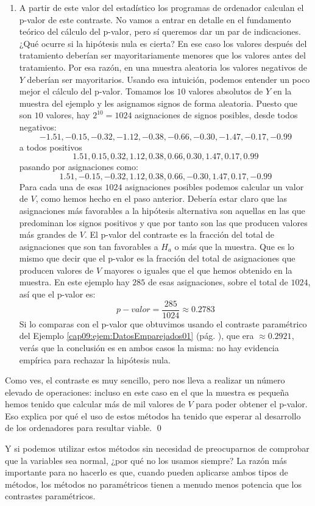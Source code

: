 \begin{ejemplo}
\begin{enumerate}
  \item A partir de este valor del estadístico los programas de ordenador calculan el p-valor de este contraste. No vamos a entrar en detalle en el fundamento teórico del cálculo del p-valor, pero sí queremos dar un par de indicaciones. ¿Qué ocurre si la hipótesis nula es cierta? En ese caso los valores después del tratamiento deberían ser mayoritariamente menores que los valores antes del tratamiento. Por esa razón, en una muestra aleatoria los valores negativos de $Y$ deberían ser mayoritarios. Usando esa intuición, podemos entender un poco mejor el cálculo del p-valor. Tomamos los $10$ valores absolutos de $Y$ en la muestra del ejemplo y les asignamos signos de forma aleatoria. Puesto que son $10$ valores, hay $2^{10} = 1024$ asignaciones de signos posibles, desde todos negativos:
      \[
      -1.51, -0.15, -0.32, -1.12, -0.38, -0.66, -0.30, -1.47, -0.17, -0.99
      \]
      a todos positivos
       \[
       1.51, 0.15, 0.32, 1.12, 0.38, 0.66, 0.30, 1.47, 0.17, 0.99
       \]
       pasando por asignaciones como:
       \[
       1.51, -0.15, -0.32, 1.12, 0.38, 0.66, -0.30, 1.47, 0.17, -0.99
       \]
       Para cada una de esas $1024$ asignaciones posibles podemos calcular un valor de $V$, como hemos hecho en el paso anterior. Debería estar claro que las asignaciones más favorables a la hipótesis alternativa son aquellas en las que predominan los signos positivos y que por tanto son las que producen valores más grandes de $V$. El p-valor del contraste es la fracción del total de asignaciones que son tan  favorables a $H_a$ o más que la muestra. Que es lo mismo que decir que el p-valor es la fracción del total de asignaciones que producen valores de $V$ mayores o iguales que el que hemos obtenido en la muestra. En este ejemplo hay $285$ de esas asignaciones, sobre el total de $1024$, así que el p-valor es:
       \[p-valor = \dfrac{285}{1024}\approx 0.2783\]
       Si lo comparas con el p-valor que obtuvimos usando el contraste paramétrico del Ejemplo \ref{cap09:ejem:DatosEmparejados01} (pág. \pageref{cap09:ejem:DatosEmparejados01}), que era $\approx 0.2921$, verás que la conclusión es en ambos casos la misma: no hay evidencia empírica para rechazar la hipótesis nula.
\end{enumerate}
Como ves, el contraste es muy sencillo, pero nos lleva a realizar un número elevado de operaciones: incluso en este caso en el que la muestra es pequeña hemos tenido que calcular más de mil valores de $V$ para poder obtener el p-valor. Eso explica por qué el uso de estos métodos ha tenido que esperar al desarrollo de los ordenadores para resultar viable.
\qed
\end{ejemplo}
Y si podemos utilizar estos métodos sin necesidad de preocuparnos de comprobar que la variables sea normal, ¿por qué no los usamos siempre? La razón más importante para no hacerlo es que, cuando pueden aplicarse ambos tipos de métodos, los métodos no paramétricos tienen a menudo menos potencia que los contrastes paramétricos.

